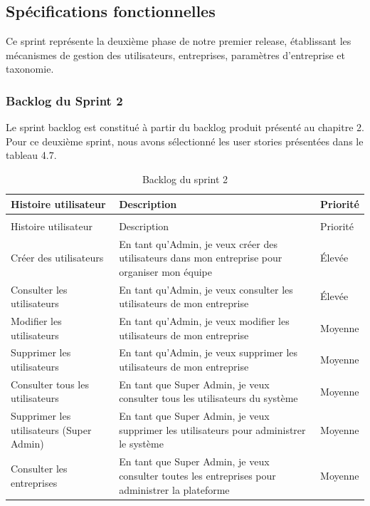 \subsection{Spécifications fonctionnelles}
\noindent Ce sprint représente la deuxième phase de notre premier release, établissant les mécanismes de gestion des utilisateurs, entreprises, paramètres d'entreprise et taxonomie.

\subsubsection{Backlog du Sprint 2}
\noindent Le sprint backlog est constitué à partir du backlog produit présenté au chapitre 2. Pour ce deuxième sprint, nous avons sélectionné les user stories présentées dans le tableau 4.7.

\begin{longtable}{|>{\raggedright\arraybackslash}p{4cm}|>{\raggedright\arraybackslash}p{7cm}|>{\raggedright\arraybackslash}p{2cm}|}
\caption{Backlog du sprint 2}
\label{tab:sprint2_backlog}\\
\hline
Histoire utilisateur & Description & Priorité \\
\hline
\endfirsthead
\multicolumn{3}{c}{\tablename\ \thetable\ -- suite} \\
\hline
Histoire utilisateur & Description & Priorité \\
\hline
\endhead
Créer des utilisateurs & En tant qu'Admin, je veux créer des utilisateurs dans mon entreprise pour organiser mon équipe & Élevée \\
\hline
Consulter les utilisateurs & En tant qu'Admin, je veux consulter les utilisateurs de mon entreprise & Élevée \\
\hline
Modifier les utilisateurs & En tant qu'Admin, je veux modifier les utilisateurs de mon entreprise & Moyenne \\
\hline
Supprimer les utilisateurs & En tant qu'Admin, je veux supprimer les utilisateurs de mon entreprise & Moyenne \\
\hline
Consulter tous les utilisateurs & En tant que Super Admin, je veux consulter tous les utilisateurs du système & Moyenne \\
\hline
Supprimer les utilisateurs (Super Admin) & En tant que Super Admin, je veux supprimer les utilisateurs pour administrer le système & Moyenne \\
\hline
Consulter les entreprises & En tant que Super Admin, je veux consulter toutes les entreprises pour administrer la plateforme & Moyenne \\

\end{longtable}
